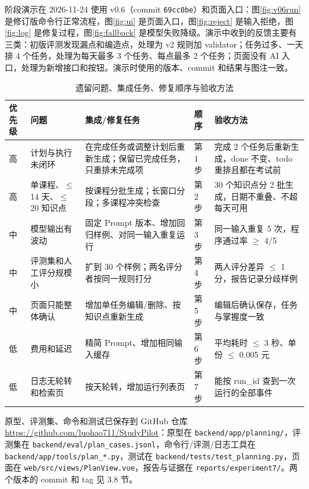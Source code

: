 \documentclass[UTF8,12pt,a4paper]{ctexart}
\begin{document}
阶段演示在 2026-11-24 使用 v0.6（commit \texttt{69cc0be}）和页面入口：图\ref{fig:v06run} 是修订版命令行正常流程，图\ref{fig:ui} 是页面入口，图\ref{fig:reject} 是输入拒绝，图\ref{fig:log} 是修复过程，图\ref{fig:fallback} 是模型失败降级。演示中收到的反馈主要有三类：初版评测发现漏点和编造点，处理为 v2 规则加 validator；任务过多、一天排 4 个任务，处理为每天最多 3 个任务、每点最多 2 个任务；页面没有 AI 入口，处理为新增接口和按钮。演示时使用的版本、commit 和结果与图注一致。

\begin{table}[H]
\centering
\caption{遗留问题、集成任务、修复顺序与验收方法}
\label{tab:remaining}
\scriptsize
\begin{tabularx}{\textwidth}{L{1.0cm}L{1.2cm}L{4.1cm}L{3.1cm}X}
\toprule
优先级 & 问题 & 集成/修复任务 & 顺序 & 验收方法 \\
\midrule
高 & 计划与执行未闭环 & 在完成任务或调整计划后重新生成；保留已完成任务，只重排未完成项 & 第1步 & 完成 2 个任务后重新生成，done 不变、todo 重排且都在考试前 \\
高 & 单课程、$\le$14 天、$\le$20 知识点 & 按课程分批生成；长窗口分段；多课程冲突检查 & 第2步 & 30 个知识点分 2 批生成，日期不重叠、不超每天可用 \\
中 & 模型输出有波动 & 固定 Prompt 版本、增加回归样例、对同一输入重复运行 & 第3步 & 同一输入重复 5 次，程序通过率 $\ge$ 4/5 \\
中 & 评测集和人工评分规模小 & 扩到 30 个样例；两名评分者按同一规则打分 & 第4步 & 两人评分差异 $\le$ 1 分，报告记录分歧样例 \\
中 & 页面只能整体确认 & 增加单任务编辑/删除、按知识点重新生成 & 第5步 & 编辑后确认保存，任务与掌握度一致 \\
低 & 费用和延迟 & 精简 Prompt、增加相同输入缓存 & 第6步 & 平均耗时 $\le$ 3 秒、单份 $\le$ 0.005 元 \\
低 & 日志无轮转和检索页 & 按天轮转，增加运行列表页 & 第7步 & 能按 run\_id 查到一次运行的全部事件 \\
\bottomrule
\end{tabularx}
\end{table}

原型、评测集、命令和测试已保存到 GitHub 仓库 \url{https://github.com/luohao711/StudyPilot}：原型在 \texttt{backend/app/planning/}，评测集在 \texttt{backend/eval/plan\_cases.jsonl}，命令行/评测/日志工具在 \texttt{backend/app/tools/plan\_*.py}，测试在 \texttt{backend/tests/test\_planning.py}，页面在 \texttt{web/src/views/PlanView.vue}，报告与证据在 \texttt{reports/experiment7/}。两个版本的 commit 和 tag 见 3.8 节。
\end{document}
